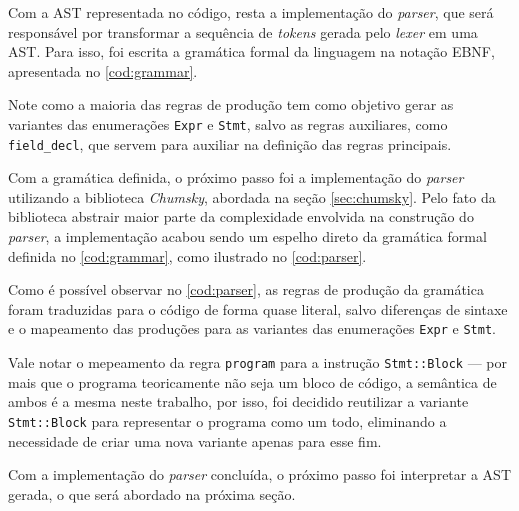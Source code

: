 Com a AST representada no código, resta a implementação do \textit{parser}, que será responsável por transformar a sequência de \textit{tokens} gerada pelo \textit{lexer} em uma AST. Para isso, foi escrita a gramática formal da linguagem na notação EBNF, apresentada no \autoref{cod:grammar}.

\codigoRust

\vspace{-1em}

Note como a maioria das regras de produção tem como objetivo gerar as variantes das enumerações \texttt{Expr} e \texttt{Stmt}, salvo as regras auxiliares, como \texttt{field\_decl}, que servem para auxiliar na definição das regras principais.

Com a gramática definida, o próximo passo foi a implementação do \textit{parser} utilizando a biblioteca \textit{Chumsky}, abordada na seção \ref{sec:chumsky}. Pelo fato da biblioteca abstrair maior parte da complexidade envolvida na construção do \textit{parser}, a implementação acabou sendo um espelho direto da gramática formal definida no \autoref{cod:grammar}, como ilustrado no \autoref{cod:parser}.

\codigoRust

\vspace{-1em}

Como é possível observar no \autoref{cod:parser}, as regras de produção da gramática foram traduzidas para o código de forma quase literal, salvo diferenças de sintaxe e o mapeamento das produções para as variantes das enumerações \texttt{Expr} e \texttt{Stmt}.

Vale notar o mepeamento da regra \texttt{program} para a instrução \texttt{Stmt::Block} — por mais que o programa teoricamente não seja um bloco de código, a semântica de ambos é a mesma neste trabalho, por isso, foi decidido reutilizar a variante \texttt{Stmt::Block} para representar o programa como um todo, eliminando a necessidade de criar uma nova variante apenas para esse fim.

Com a implementação do \textit{parser} concluída, o próximo passo foi interpretar a AST gerada, o que será abordado na próxima seção.
